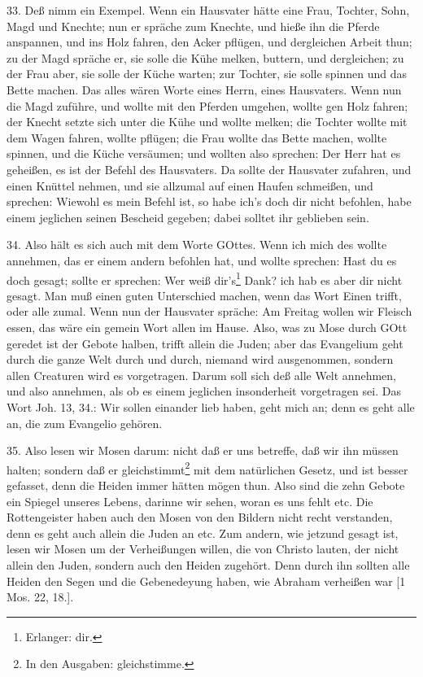 33. Deß nimm ein Exempel. Wenn ein Hausvater hätte eine Frau, Tochter, Sohn, Magd und Knechte; nun er spräche zum Knechte, und hieße ihn die Pferde anspannen, und ins Holz fahren, den Acker pflügen, und dergleichen Arbeit thun; zu der Magd spräche er, sie solle die Kühe melken, buttern, und dergleichen; zu der Frau aber, sie solle der Küche warten; zur Tochter, sie solle spinnen und das Bette machen. Das alles wären Worte eines Herrn, eines Hausvaters. Wenn nun die Magd zuführe, und wollte mit den Pferden umgehen, wollte gen Holz fahren; der Knecht setzte sich unter die Kühe und wollte melken; die Tochter wollte mit dem Wagen fahren, wollte pflügen; die Frau wollte das Bette machen, wollte spinnen, und die Küche versäumen; und wollten also sprechen: Der Herr hat es geheißen, es ist der Befehl des Hausvaters. Da sollte der Hausvater zufahren, und einen Knüttel nehmen, und sie allzumal auf einen Haufen schmeißen, und sprechen: Wiewohl es mein Befehl ist, so habe ich’s doch dir nicht befohlen, habe einem jeglichen seinen Bescheid gegeben; dabei solltet ihr geblieben sein.

34. Also hält es sich auch mit dem Worte GOttes. Wenn ich mich des wollte annehmen, das er einem andern befohlen hat, und wollte sprechen: Hast du es doch gesagt; sollte er sprechen: Wer weiß dir’s\footnote{Erlanger: dir.} Dank? ich hab es aber dir nicht gesagt. Man muß einen guten Unterschied machen, wenn das Wort Einen trifft, oder alle zumal. Wenn nun der Hausvater spräche: Am Freitag wollen wir Fleisch essen, das wäre ein gemein Wort allen im Hause. Also, was zu Mose durch GOtt geredet ist der Gebote halben, trifft allein die Juden; aber das Evangelium geht durch die ganze Welt durch und durch, niemand wird ausgenommen, sondern allen Creaturen wird es vorgetragen. Darum soll sich deß alle Welt annehmen, und also annehmen, als ob es einem jeglichen insonderheit vorgetragen sei. Das Wort Joh. 13, 34.: Wir sollen einander lieb haben, geht mich an; denn es geht alle an, die zum Evangelio gehören.

35. Also lesen wir Mosen darum: nicht daß er uns betreffe, daß wir ihn müssen halten; sondern daß er gleichstimmt\footnote{In den Ausgaben: gleichstimme.} mit dem natürlichen Gesetz, und ist besser gefasset, denn die Heiden immer hätten mögen thun. Also sind die zehn Gebote ein Spiegel unseres Lebens, darinne wir sehen, woran es uns fehlt etc. Die Rottengeister haben auch den Mosen von den Bildern nicht recht verstanden, denn es geht auch allein die Juden an etc. Zum andern, wie jetzund gesagt ist, lesen wir Mosen um der Verheißungen willen, die von Christo lauten, der nicht allein den Juden, sondern auch den Heiden zugehört. Denn durch ihn sollten alle Heiden den Segen und die Gebenedeyung haben, wie Abraham verheißen war [1 Mos. 22, 18.].

